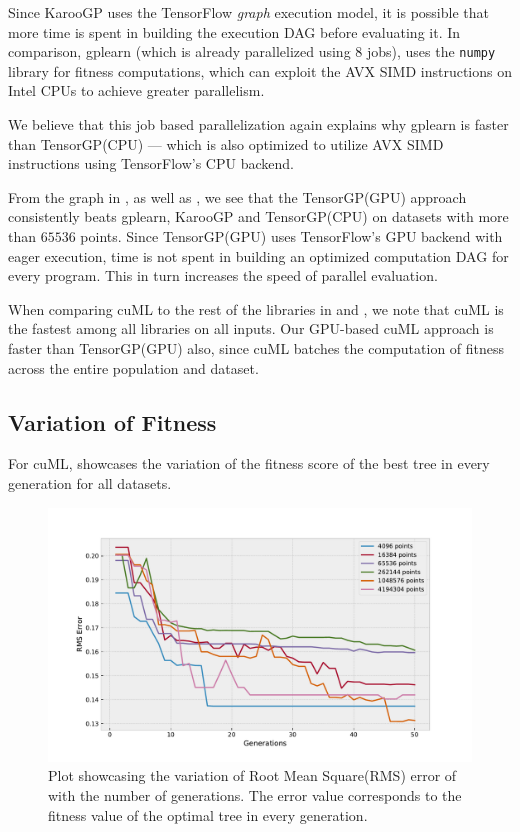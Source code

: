 Since KarooGP uses the TensorFlow \textit{graph} execution model, it is possible that more time is spent in building the execution DAG before evaluating it. In comparison, gplearn (which is already parallelized using $8$ jobs), uses the \lstinline!numpy! library for fitness computations, which can exploit the AVX SIMD instructions on Intel CPUs to achieve greater parallelism. 

We believe that this job based parallelization again explains why gplearn is faster than TensorGP(CPU) --- which is also optimized to utilize AVX SIMD instructions using TensorFlow's CPU backend.

From the graph in , as well as , we see that the TensorGP(GPU) approach consistently beats gplearn, KarooGP and TensorGP(CPU) on datasets with more than $65536$ points. Since TensorGP(GPU) uses TensorFlow's GPU backend with eager execution, time is not spent in building an optimized computation DAG for every program. This in turn increases the speed of parallel evaluation.

When comparing cuML to the rest of the libraries in  and , we note that cuML is the fastest among all libraries on all inputs. Our GPU-based cuML approach is faster than TensorGP(GPU) also, since cuML batches the computation of fitness across the entire population and dataset. 

\subsection{Variation of Fitness}
\label{subsec:fitnessvar}


For cuML,  showcases the variation of the fitness score of the best tree in every generation for all datasets. 

\begin{figure}[htbp]
  \centering
  \includegraphics[scale=0.59]{images/RMSError.pdf}
  \caption{Plot showcasing the variation of Root Mean Square(RMS) error of with the number of generations. The error value corresponds to the fitness value of the optimal tree in every generation. }
  \label{fig:besttrainfit}
\end{figure}

